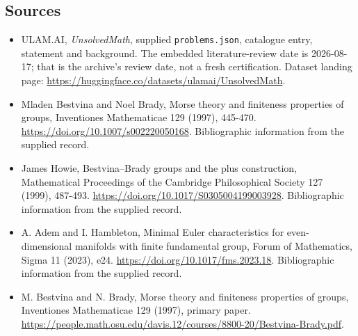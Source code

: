 \documentclass[11pt,a4paper]{article}
\begin{document}
\subsection{Sources}

{\small

\begin{itemize}

\item[\hypertarget{source:statement:1}{S1}] ULAM.AI, \emph{UnsolvedMath}, supplied \texttt{problems.json}, catalogue entry, statement and background. The embedded literature-review date is 2026-08-17; that is the archive’s review date, not a fresh certification. Dataset landing page: \url{https://huggingface.co/datasets/ulamai/UnsolvedMath}.

\item[\hypertarget{source:statement:2}{S2}] Mladen Bestvina and Noel Brady, Morse theory and finiteness properties of groups, Inventiones Mathematicae 129 (1997), 445-470. \url{https://doi.org/10.1007/s002220050168}. Bibliographic information from the supplied record.

\item[\hypertarget{source:statement:3}{S3}] James Howie, Bestvina--Brady groups and the plus construction, Mathematical Proceedings of the Cambridge Philosophical Society 127 (1999), 487-493. \url{https://doi.org/10.1017/S0305004199003928}. Bibliographic information from the supplied record.

\item[\hypertarget{source:statement:4}{S4}] A. Adem and I. Hambleton, Minimal Euler characteristics for even-dimensional manifolds with finite fundamental group, Forum of Mathematics, Sigma 11 (2023), e24. \url{https://doi.org/10.1017/fms.2023.18}. Bibliographic information from the supplied record.

\item[R1] M. Bestvina and N. Brady, Morse theory and finiteness properties of groups, Inventiones Mathematicae 129 (1997), primary paper.
\url{https://people.math.osu.edu/davis.12/courses/8800-20/Bestvina-Brady.pdf}.
\end{itemize}

}

\label{end:statement}
\end{document}
